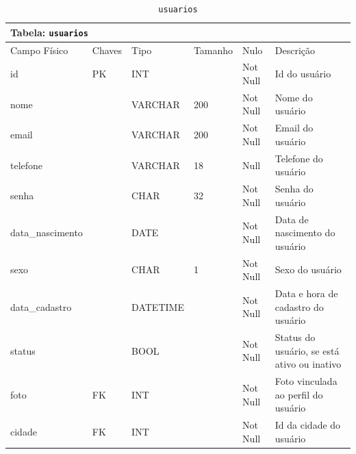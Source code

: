 \documentclass[12pt,a4paper]{article}
\begin{document}
\begin{center}
\begin{table}[h!]
	\caption{\texttt{usuarios}}
	\label{tabela:usuarios}
	\begin{tabular}{|p{2.5cm}|p{1cm}|p{1.25cm}|p{1.75cm}|p{1.25cm}|p{5cm}|}\hline	
		\multicolumn{6}{|p{16cm}|}{\cellcolor{cinzaClaro}  \centering Tabela: \texttt{usuarios}} \\ \hline %
		{\small Campo Físico}   & {\small Chaves} & {\small Tipo} & {\small Tamanho} & {\small Nulo} & {\small Descrição}\\\hline %
		
		{\tiny id} & {\tiny PK} & {\tiny INT} & {\tiny } & {\tiny Not Null} &{\tiny Id do usuário}\\\hline
		{\tiny nome} & {\tiny } & {\tiny VARCHAR} & {\tiny 200} & {\tiny Not Null} &{\tiny  Nome do usuário}\\\hline
		{\tiny email} & {\tiny } & {\tiny VARCHAR} & {\tiny 200} & {\tiny Not Null} &{\tiny Email do usuário}\\\hline
		{\tiny telefone} & {\tiny } & {\tiny VARCHAR } & {\tiny 18} & {\tiny  Null} &{\tiny Telefone do usuário}\\\hline
		{\tiny senha} & {\tiny } & {\tiny CHAR} & {\tiny 32} & {\tiny Not Null} &{\tiny Senha do usuário}\\\hline
		{\tiny data\_nascimento} & {\tiny } & {\tiny DATE} & {\tiny } & {\tiny Not Null} &{\tiny Data de nascimento do usuário}\\\hline
		{\tiny sexo} & {\tiny } & {\tiny CHAR} & {\tiny 1} & {\tiny Not Null} &{\tiny Sexo do usuário}\\\hline
		{\tiny data\_cadastro} & {\tiny } & {\tiny DATETIME} & {\tiny } & {\tiny Not Null} &{\tiny Data e hora de cadastro do usuário}\\\hline
		{\tiny status} & {\tiny } & {\tiny BOOL} & {\tiny } & {\tiny Not Null} &{\tiny Status do usuário, se está ativo ou inativo}\\\hline		
		{\tiny foto} & {\tiny FK} & {\tiny INT} & {\tiny } & {\tiny Not Null} &{\tiny Foto vinculada ao perfil do usuário}\\\hline
		{\tiny cidade} & {\tiny FK} & {\tiny INT} & {\tiny } & {\tiny Not Null} &{\tiny Id da cidade do usuário}\\\hline
		
			
	\end{tabular}
\end{table}	
\end{center}
\end{document}
